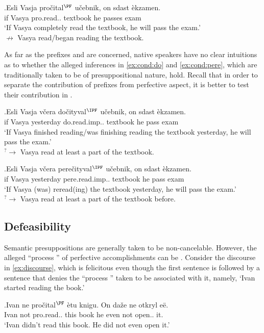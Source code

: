 \exg.\label{ex:cond}Esli Vasja pro\v{c}ital$^{\PF}$ u\v{c}ebnik, on sdast \`{e}kzamen.\\
if Vasya pro.read.. textbook he passes exam\\
\trans `If Vasya completely read the textbook, he will pass the exam.'\\
$\nrightarrow$ Vasya read/began reading the textbook.

As far as the prefixes  and  are concerned, native speakers have no clear intuitions as to whether the alleged inferences in \ref{ex:cond:do} and \ref{ex:cond:pere}, which are traditionally taken to be of presuppositional nature, hold. Recall that in order to separate the contribution of prefixes from perfective aspect, it is better to test their contribution in .

\exg.\label{ex:cond:do}Esli Vasja v\v{c}era do\v{c}ityval$^{\IPF}$ u\v{c}ebnik, on sdast \`{e}kzamen.\\
if Vasya yesterday do.read.imp.. textbook he pass exam\\
\trans `If Vasya finished reading/was finishing reading the textbook yesterday, he will pass the exam.'\\
$^?\rightarrow$ Vasya read at least a part of the textbook.

\exg.\label{ex:cond:pere}Esli Vasja v\v{c}era pere\v{c}ityval$^{\IPF}$ u\v{c}ebnik, on sdast \`{e}kzamen.\\
if Vasya yesterday pere.read.imp.. textbook he pass exam\\
\trans `If Vasya (was) reread(ing) the textbook yesterday, he will pass the exam.'\\
$^?\rightarrow$ Vasya read at least a part of the textbook before.


\subsection{Defeasibility}
Semantic presuppositions are generally taken to be non-cancelable. However, the alleged ``process '' of perfective accomplishments can be . Consider the discourse in \ref{ex:discourse}, which is felicitous even though the first sentence is followed by a sentence that denies the ``process '' taken to be associated with it, namely, `Ivan started reading the book.'

\exg.\label{ex:discourse}Ivan ne pro\v{c}ital$^{\PF}$ \`{e}tu knigu. On da\v{z}e ne otkryl e\"{e}.\\
Ivan not pro.read.. this book he even not open.. it.\\
\trans `Ivan didn't read this book. He did not even open it.'

